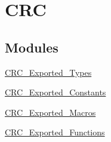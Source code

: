 \hypertarget{group__CRC}{
\section{CRC}
\label{group__CRC}
}
\subsection*{Modules}
\begin{DoxyCompactItemize}
\item 
\hyperlink{group__CRC__Exported__Types}{CRC\_\-Exported\_\-Types}
\item 
\hyperlink{group__CRC__Exported__Constants}{CRC\_\-Exported\_\-Constants}
\item 
\hyperlink{group__CRC__Exported__Macros}{CRC\_\-Exported\_\-Macros}
\item 
\hyperlink{group__CRC__Exported__Functions}{CRC\_\-Exported\_\-Functions}
\end{DoxyCompactItemize}
